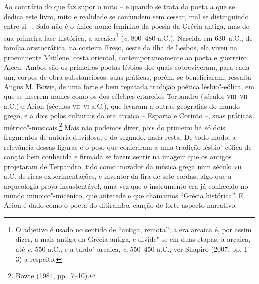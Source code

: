 \noindent{}Ao contrário do que faz supor o mito -- e quando se trata da poeta a que se
dedica este livro, mito e realidade se confundem sem cessar, mal se
distinguindo entre si --, Safo não é o único nome feminino da poesia da Grécia
	antiga, mas de sua primeira fase histórica, a arcaica\footnote{ O adjetivo é
	usado no sentido de “antiga, remota”; a era arcaica é, por assim dizer, a mais
	antiga da Grécia antiga, e divide"-se em duas etapas: a arcaica, até \textit{c.}
	550 a.C., e a tardo"-arcaica, \textit{c.} 550--450 a.C.; ver Shapiro (2007, pp.
	1--3) a respeito.} (\textit{c.} 800--480 a.C.). Nascida em 630~a.C., de família
aristocrática, na costeira Ereso, oeste da ilha de Lesbos, ela viveu na
proeminente Mitilene, costa oriental, contemporaneamente ao poeta e guerreiro
Alceu. Ambos são os primeiros poetas lésbios dos quais sobreviveram, para cada
um, corpos de obra substanciosos; suas práticas, porém, se beneficiaram,
ressalta Angus M. Bowie, de uma forte e bem reputada tradição
poética lésbio"-eólica, em que se inserem nomes como os dos célebres citaredos
Terpandro (séculos \textsc{viii}--\textsc{vii} a.C.) e Árion (séculos
\textsc{vii}--\textsc{vi} a.C.), que levaram a
outras geografias do mundo grego, e a dois polos culturais da era arcaica --
	Esparta e Corinto --, suas práticas métrico"-musicais.\footnote{ Bowie (1984,
	pp.~7--10).} Mais não podemos dizer,
pois do primeiro há só dois fragmentos de autoria duvidosa, e do segundo, nada
resta. De todo modo, a relevância dessas figuras e o peso que conferiram a uma
tradição lésbio"-eólica de canção bem conhecida e firmada se
fazem sentir na imagem que os antigos projetaram de Terpandro, tido como
inovador da música grega num século \textsc{vii} a.C. de ricas experimentações, e
inventor da lira de sete cordas, algo que a arqueologia prova insustentável,
uma vez que o instrumento era já conhecido no mundo minoico"-micênico, que
antecede o que chamamos “Grécia histórica”. E Árion é dado como o
poeta do ditirambo, canção de forte aspecto narrativo.

